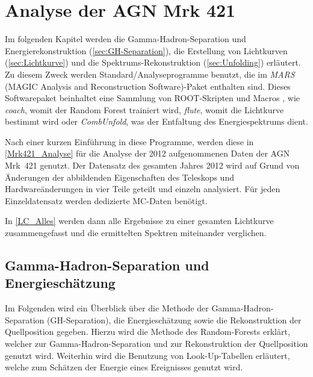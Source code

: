 \chapter{Analyse der AGN Mrk 421}
\label{chapter:Analyse}

Im folgenden Kapitel werden die Gamma-Hadron-Separation und Energierekonstruktion (\autoref{sec:GH-Separation}), die Erstellung von Lichtkurven (\autoref{sec:Lichtkurve}) und die Spektrums-Rekonstruktion (\autoref{sec:Unfolding}) erläutert.
Zu diesem Zweck werden Standard\-/Analyseprogramme benutzt, die im \textit{MARS} (MAGIC Analysis and Reconstruction Software)-Paket enthalten sind.
Dieses Softwarepaket beinhaltet eine Sammlung von ROOT-Skripten und Macros \cite{MARS}, wie \textit{coach}, womit der Random Forest trainiert wird, \textit{flute}, womit die Lichtkurve bestimmt wird oder \textit{CombUnfold}, was der Entfaltung des Energiespektrums dient. 

Nach einer kurzen Einführung in diese Programme, werden diese in \autoref{Mrk421_Analyse} für die Analyse der 2012 aufgenommenen Daten der AGN Mrk~421 genutzt.
Der Datensatz des gesamten Jahres 2012 wird auf Grund von Änderungen der abbildenden Eigenschaften des Teleskops und Hardwareänderungen in vier Teile geteilt und einzeln analysiert. 
Für jeden Einzeldatensatz werden dedizierte MC-Daten benötigt.

In \autoref{LC_Alles} werden dann alle Ergebnisse zu einer gesamten Lichtkurve zusammengefasst und die ermittelten Spektren miteinander verglichen.


\section{Gamma-Hadron-Separation und Energieschätzung}
\label{sec:GH-Separation}
Im Folgenden wird ein Überblick über die Methode der Gamma-Hadron-Separation (GH-Separation), die Energieschätzung sowie die Rekonstruktion der Quellposition gegeben.  
Hierzu wird die Methode des Random-Forests erklärt, welcher zur Gamma-Hadron-Separation und zur Rekonstruktion der Quellposition genutzt wird.
Weiterhin wird die Benutzung von Look-Up-Tabellen erläutert, welche zum Schätzen der Energie eines Ereignisses genutzt wird.


